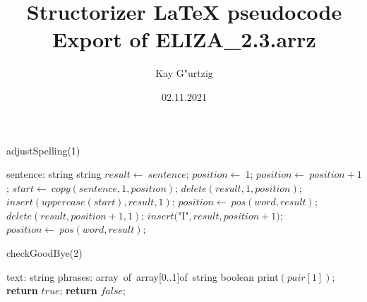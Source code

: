 \documentclass[a4paper,10pt]{article}
\title{Structorizer LaTeX pseudocode Export of ELIZA\_2.3.arrz}
\author{Kay G"urtzig}
\date{02.11.2021}
\begin{document}
\begin{algorithm}
\caption{adjustSpelling(1)}
\begin{algorithmic}[5]
\State {}
    \State sentence: string
  \EndDecl
    \State string
  \EndDecl
  \State \(result\gets\ sentence\);
  \State \(position\gets\ 1\);
    \State \(position\gets\ position+1\);
  \EndWhile
    \State \(start\gets\ copy(sentence,1,position)\);
    \State \(delete(result,1,position)\);
    \State \(insert(uppercase(start),result,1)\);
  \EndIf
    \State \(position\gets\ pos(word,result)\);
      \State \(delete(result,position+1,1)\);
      \State \(insert(\)"{}I"{}\(,result,position+1)\);
      \State \(position\gets\ pos(word,result)\);
    \EndWhile
  \EndFor
\EndFunction
\end{algorithmic}
\end{algorithm}


\begin{algorithm}
\caption{checkGoodBye(2)}
\begin{algorithmic}[5]
\State {}
\State {}
\State {}
\State {}
    \State text: string
    \State phrases: array\ of\ array[0..1]of\ string
  \EndDecl
    \State boolean
  \EndDecl
      \State \(\)print\((pair[1])\);
      \State \textbf{return} \(true\);
    \EndIf
  \EndFor
  \State \textbf{return} \(false\);
\EndFunction
\end{algorithmic}
\end{algorithm}
\end{document}
